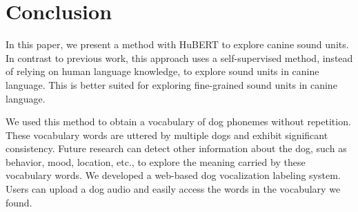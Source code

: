 \section{Conclusion}

In this paper, we present a method with HuBERT to explore canine sound units. In contrast to previous work, this approach uses a self-supervised method, instead of relying on human language knowledge, to explore sound units in canine language. This is better suited for exploring fine-grained sound units in canine language.

We used this method to obtain a vocabulary of dog phonemes without repetition. These vocabulary words are uttered by multiple dogs and exhibit significant consistency. Future research can detect other information about the dog, such as behavior, mood, location, etc., to explore the meaning carried by these vocabulary words. We developed a web-based dog vocalization labeling system. Users can upload a dog audio and easily access the words in the vocabulary we found.
